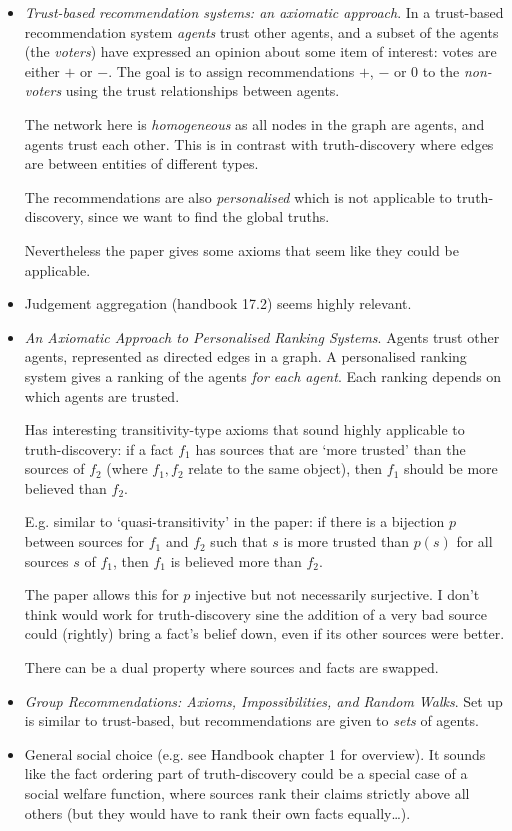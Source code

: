 \documentclass{article}
\theoremstyle{definition} \newtheorem{definition}{Definition}
\theoremstyle{definition} \newtheorem{example}{Example}
\theoremstyle{plain} \newtheorem{axiom}{Axiom}
\theoremstyle{plain} \newtheorem*{remark}{Remark}
\theoremstyle{remark} \newtheorem*{notation}{Notation}
\theoremstyle{plain} \newtheorem{lemma}{Lemma}
\theoremstyle{plain} \newtheorem{theorem}{Theorem}
\theoremstyle{plain} \newtheorem{proposition}{Proposition}
\begin{document}
\begin{itemize}

\item \emph{Trust-based recommendation systems: an axiomatic
approach}{\cite{andersen}}. In a trust-based recommendation system
\emph{agents} trust other agents, and a subset of the agents (the
\emph{voters}) have expressed an opinion about some item of interest: votes are
either $+$ or $-$. The goal is to assign recommendations $+$, $-$ or $0$ to the
\emph{non-voters} using the trust relationships between agents.

The network here is \emph{homogeneous} as all nodes in the graph are agents,
and agents trust each other. This is in contrast with truth-discovery where
edges are between entities of different types.

The recommendations are also \emph{personalised} which is not applicable to
truth-discovery, since we want to find the global truths.

Nevertheless the paper gives some axioms that seem like they could be
applicable.

\item Judgement aggregation (handbook 17.2) seems highly relevant.

\item \emph{An Axiomatic Approach to Personalised Ranking
Systems}{\cite{altman_personalised}}. Agents trust other agents, represented as
directed edges in a graph. A personalised ranking system gives a ranking of the
agents \emph{for each agent}. Each ranking depends on which agents are trusted.

Has interesting transitivity-type axioms that sound highly applicable to
truth-discovery: if a fact $f_1$ has sources that are `more trusted' than the
sources of $f_2$ (where $f_1, f_2$ relate to the same object), then $f_1$
should be more believed than $f_2$.

E.g. similar to `quasi-transitivity' in the paper: if there is a bijection $p$
between sources for $f_1$ and $f_2$ such that $s$ is more trusted than $p(s)$
for all sources $s$ of $f_1$, then $f_1$ is believed more than $f_2$.

The paper allows this for $p$ injective but not necessarily surjective. I don't
think would work for truth-discovery sine the addition of a very bad source
could (rightly) bring a fact's belief down, even if its other sources were
better.

There can be a dual property where sources and facts are swapped.

\item \emph{Group Recommendations: Axioms, Impossibilities, and Random
Walks}{\cite{lev}}. Set up is similar to trust-based, but recommendations are
given to \emph{sets} of agents.

\item General social choice (e.g. see Handbook chapter 1 for overview). It
sounds like the fact ordering part of truth-discovery could be a special case
of a social welfare function, where sources rank their claims strictly above
all others (but they would have to rank their own facts equally\ldots).

\end{itemize}
\end{document}
